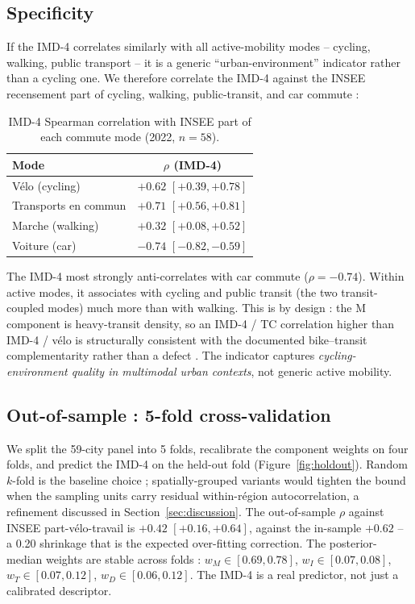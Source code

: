 \documentclass[11pt,a4paper]{article}
\begin{document}
\subsection{Specificity}

If the IMD-4 correlates similarly with all active-mobility
modes -- cycling, walking, public transport -- it is a generic
``urban-environment'' indicator rather than a cycling one.  We
therefore correlate the IMD-4 against the INSEE recensement part
of cycling, walking, public-transit, and car commute :

\begin{table}[H]
\centering
\caption{IMD-4 Spearman correlation with INSEE part of each
commute mode (2022, $n = 58$).}
\label{tab:specificity}
\small
\begin{tabular}{@{}lc@{}}
\toprule
Mode & $\rho$ (IMD-4) \\
\midrule
V\'elo (cycling)     & $+0.62$ $[+0.39, +0.78]$ \\
Transports en commun & $+0.71$ $[+0.56, +0.81]$ \\
Marche (walking)     & $+0.32$ $[+0.08, +0.52]$ \\
Voiture (car)        & $-0.74$ $[-0.82, -0.59]$ \\
\bottomrule
\end{tabular}
\end{table}

The IMD-4 most strongly anti-correlates with car commute
($\rho = -0.74$).  Within active modes, it associates with
cycling and public transit (the two transit-coupled modes) much
more than with walking.  This is by design : the M component is
heavy-transit density, so an IMD-4 / TC correlation higher than
IMD-4 / v\'elo is structurally consistent with the documented
bike--transit complementarity rather than a defect
\citep{Heinen2010,Saberi2018,Martens2007}.
The indicator captures \emph{cycling-environment quality in
multimodal urban contexts}, not generic active mobility.

\subsection{Out-of-sample : 5-fold cross-validation}

We split the 59-city panel into 5 folds, recalibrate the
component weights on four folds, and predict the IMD-4 on the
held-out fold (Figure~\ref{fig:holdout}).  Random $k$-fold is the
baseline choice ; spatially-grouped variants
\citep{Roberts2017,Pohjankukka2017} would tighten the bound
when the sampling units carry residual within-r\'egion
autocorrelation, a refinement discussed in
Section~\ref{sec:discussion}.  The out-of-sample
$\rho$ against INSEE part-v\'elo-travail is $+0.42$
$[+0.16, +0.64]$, against the in-sample $+0.62$ -- a 0.20
shrinkage that is the expected over-fitting correction.  The
posterior-median weights are stable across folds : $w_M \in
[0.69, 0.78]$, $w_I \in [0.07, 0.08]$, $w_T \in [0.07, 0.12]$,
$w_D \in [0.06, 0.12]$.  The IMD-4 is a real predictor, not
just a calibrated descriptor.
\end{document}
